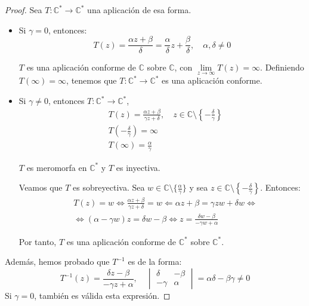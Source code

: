 \begin{proof}
    Sea $T: \mathbb{C}^\ast \to \mathbb{C}^\ast$ una aplicación de esa forma.
    \begin{itemize}
        \item Si $\gamma = 0$, entonces:
              $$T(z) = \frac{\alpha z + \beta}{\delta} = \frac{\alpha}{\delta}z + \frac{\beta}{\delta}, \quad \alpha, \delta \neq 0$$

              $T$ es una aplicación conforme de $\mathbb{C}$ sobre $\mathbb{C}$, con $\lim\limits_{z \to \infty} T(z) = \infty$.
              Definiendo $T(\infty) = \infty$, tenemos que $T: \mathbb{C}^\ast \to \mathbb{C}^\ast$ es una aplicación conforme.

        \item Si $\gamma \neq 0$, entonces $T: \mathbb{C}^\ast \to \mathbb{C}^\ast$,
              \begin{align*}
                   & T(z) = \frac{\alpha z + \beta}{\gamma z + \delta}, \quad z \in \mathbb{C} \setminus \left\{-\frac{\delta}{\gamma}\right\} \\
                   & T\left(-\frac{\delta}{\gamma}\right) = \infty                                                                             \\
                   & T(\infty) = \frac{\alpha}{\gamma}
              \end{align*}

              $T$ es meromorfa en $\mathbb{C}^\ast$ y $T$ es inyectiva.

              Veamos que $T$ es sobreyectiva.
              Sea $w \in \mathbb{C} \setminus \{\frac{\alpha}{\gamma}\}$ y sea $z \in \mathbb{C} \setminus \left\{-\frac{\delta}{\gamma}\right\}$.
              Entonces:
              \begin{align*}
                   & T(z) = w \Leftrightarrow \frac{\alpha z + \beta}{\gamma z + \delta} = w \Leftarrow \alpha z + \beta = \gamma zw + \delta w \Leftrightarrow \\
                   & \Leftrightarrow (\alpha - \gamma w)z = \delta w - \beta \Leftrightarrow z = \frac{\delta w - \beta}{-\gamma w + \alpha}
              \end{align*}

              Por tanto, $T$ es una aplicación conforme de $\mathbb{C}^\ast$ sobre $\mathbb{C}^\ast$.
    \end{itemize}

    Además, hemos probado que $T^{-1}$ es de la forma:
    $$T^{-1}(z) = \frac{\delta z - \beta}{-\gamma z + \alpha}, \quad \begin{vmatrix}
            \delta  & -\beta \\
            -\gamma & \alpha
        \end{vmatrix} = \alpha\delta - \beta\gamma \neq 0$$
    Si $\gamma = 0$, también es válida esta expresión.
\end{proof}

